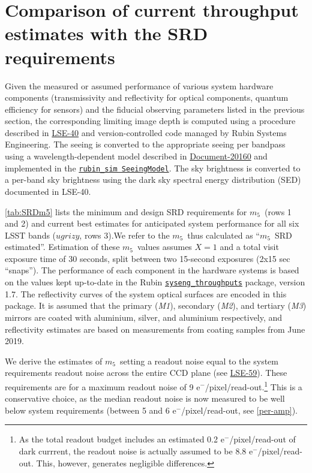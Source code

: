 \documentclass[PST,authoryear,toc]{lsstdoc}
\newcommand{\mf}{\ensuremath{m_5}}
\begin{document}
\section{Comparison of current throughput estimates with the SRD requirements \label{sec:SRD}}

Given the measured or assumed performance of various system hardware components (transmissivity and reflectivity 
for optical components, quantum efficiency for sensors) and the fiducial observing 
parameters listed in the previous section, the corresponding limiting image depth is computed using a procedure 
described in 
\href{https://docushare.lsst.org/docushare/dsweb/Get/LSE-40}{{LSE-40}}
and version-controlled code managed by Rubin Systems Engineering. The seeing is converted to the appropriate 
seeing per bandpass using a wavelength-dependent model described in 
\href{https://docushare.lsst.org/docushare/dsweb/Get/Document-20160}{{Document-20160}} 
and implemented in the 
\href{https://github.com/lsst/rubin_sim/blob/main/rubin_sim/site_models/seeingModel.py}{{\tt rubin\_sim SeeingModel}}. 
The sky brightness is converted to a per-band sky brightness using the dark sky spectral energy distribution (SED) documented in LSE-40.


\autoref{tab:SRDm5} lists the minimum and design SRD requirements for \mf\ (rows 1 and 2) and current best estimates for anticipated system performance for all six LSST bands ($ugrizy$, rows 3).We refer to the \mf\ thus calculated as  ``\mf\ SRD estimated''. Estimation of these \mf\ values assumes $X=1$ and a total visit exposure time of 30 seconds, split between two 15-second exposures (2x15 sec ``snaps''). The performance of each component in the hardware systems is based on the values kept up-to-date in the Rubin \href{https://github.com/lsst-pst/syseng_throughputs}{{\tt syseng\_throughputs}} package, version 1.7. {The  reflectivity curves of the system optical surfaces are encoded in this package. It is assumed that the primary ({\it M1}), secondary ({\it M2}), and tertiary ({\it M3}) mirrors are coated with aluminium, silver, and aluminium respectively, and reflectivity estimates are based on measurements from coating samples from June 2019.}

We derive the estimates of \mf\ setting a readout noise equal to the system requirements readout noise across the entire CCD plane (see \href{https://docushare.lsst.org/docushare/dsweb/Get/LSE-59}{{LSE-59}}). These requirements are for a maximum readout noise of 9 e$^-$/pixel/read-out.\footnote{As the total readout budget includes an estimated 0.2  e$^-$/pixel/read-out of dark currrent, the readout noise is actually assumed to be 8.8  e$^-$/pixel/read-out. This, however, generates negligible differences.} This is a conservative choice, as the median readout noise is now measured to be well below system requirements (between 5 and 6  e$^-$/pixel/read-out, see \autoref{per-amp}).  
\end{document}
